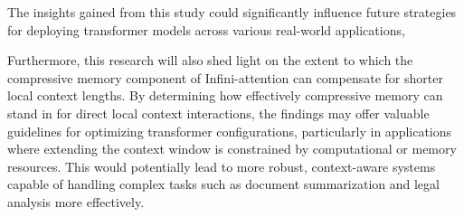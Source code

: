 The insights gained from this study could significantly influence future strategies for deploying transformer models across various real-world applications,

 Furthermore, this research will also shed light on the extent to which the compressive memory component of Infini-attention can compensate for shorter local context lengths. 
 By determining how effectively compressive memory can stand in for direct local context interactions, the findings may offer valuable guidelines for
  optimizing transformer configurations, particularly in applications where extending the context window is constrained by computational or memory resources.
  This would potentially lead to more robust, context-aware systems capable of handling complex tasks such as document summarization and legal analysis more effectively.


